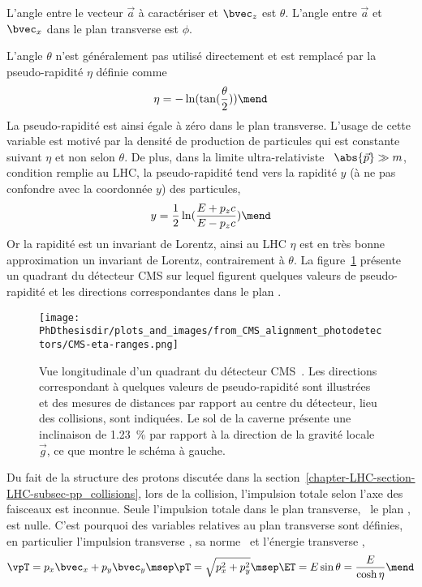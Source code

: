 L'angle entre le vecteur $\vec{a}$ à caractériser et $\bvec_z$ est $\theta$.
L'angle entre $\vec{a}$ et $\bvec_x$ dans le plan transverse est $\phi$.
\par L'angle $\theta$ n'est généralement pas utilisé directement et est remplacé par la \og pseudo-rapidité \fg{} $\eta$ définie comme
\begin{equation}
\eta = - \ln(\tan(\frac{\theta}{2}))
\mend
\label{eq-chapter-LHC-section-CMS-subsec-overview_and_coordinates-eta_definition}
\end{equation}
La pseudo-rapidité est ainsi égale à zéro dans le plan transverse.
L'usage de cette variable est motivé par la densité de production de particules qui est constante suivant $\eta$ et non selon $\theta$.
De plus, dans la limite \og ultra-relativiste \fg{} \ie\ $\abs{\vec{p}}\gg m$, condition remplie au LHC, la pseudo-rapidité tend vers la rapidité $y$ (à ne pas confondre avec la coordonnée $y$) des particules,
\begin{equation}
y = \frac{1}{2} \ln(\frac{E+p_zc}{E-p_zc})
\mend
\end{equation}
Or la rapidité est un invariant de Lorentz, ainsi au LHC $\eta$ est en très bonne approximation un invariant de Lorentz, contrairement à $\theta$.
La figure~\ref{fig-chapter-LHC-section-CMS-subsec-overview_and_coordinates-CMS-eta-ranges} présente un quadrant du détecteur CMS sur lequel figurent quelques valeurs de pseudo-rapidité et les directions correspondantes dans le plan .
\begin{figure}[h]
\centering
\texttt{[image: \\PhDthesisdir/plots\_and\_images/from\_CMS\_alignment\_photodetectors/CMS-eta-ranges.png]}
\caption[Vue longitudinale d'un quadrant du détecteur CMS.]{Vue longitudinale d'un quadrant du détecteur CMS~\cite{CMS_alignment_photodetectors}. Les directions correspondant à quelques valeurs de pseudo-rapidité sont illustrées et des mesures de distances par rapport au centre du détecteur, lieu des collisions, sont indiquées. Le sol de la caverne présente une inclinaison de \SI{1.23}{\%} par rapport à la direction de la gravité locale $\vec{g}$, ce que montre le schéma à gauche.}
\label{fig-chapter-LHC-section-CMS-subsec-overview_and_coordinates-CMS-eta-ranges}
\end{figure}
\par Du fait de la structure des protons discutée dans la section~\ref{chapter-LHC-section-LHC-subsec-pp_collisions}, lors de la collision, l'impulsion totale selon l'axe des faisceaux est inconnue.
Seule l'impulsion totale dans le plan transverse, \ie\ le plan , est nulle.
C'est pourquoi des variables relatives au plan transverse sont définies, en particulier l'impulsion transverse \vpT, sa norme \pT\ et l'\og énergie transverse \fg{} \ET,
\begin{equation}
\vpT = p_x\bvec_x + p_y\bvec_y
\msep
\pT = \sqrt{p_x^2+p_y^2}
\msep
\ET = E\sin\theta = \frac{E}{\cosh\eta}
\mend
\end{equation}